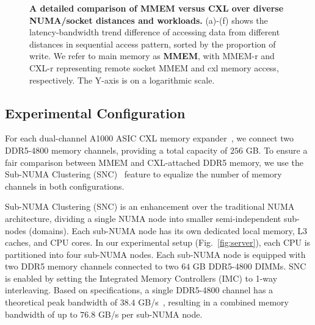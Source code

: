 \begin{figure}[t]
{  \label{fig:writeonly}}%
 \caption[A detailed comparison of MMEM versus CXL over diverse NUMA/socket distances and workloads]{\textbf{A detailed comparison of MMEM versus CXL over diverse NUMA/socket distances and workloads.} (a)-(f) shows the latency-bandwidth trend difference of accessing data from different distances in sequential access pattern, sorted by the proportion of write. We refer to main memory as \textbf{MMEM}, with MMEM-r and CXL-r representing remote socket MMEM and cxl memory access, respectively. The Y-axis is on a logarithmic scale.}
\label{fig:microbench-2}
\end{figure}

\subsection{Experimental Configuration}
\label{ssec:config}
For each dual-channel A1000 ASIC CXL memory expander~\cite{A1000}, we connect two DDR5-4800 memory channels, providing a total capacity of $256$ GB. To ensure a fair comparison between MMEM and CXL-attached DDR5 memory, we use the Sub-NUMA Clustering (SNC)~\cite{snc} feature to equalize the number of memory channels in both configurations. 

 Sub-NUMA Clustering (SNC) is an enhancement over the traditional NUMA architecture, dividing a single NUMA node into smaller semi-independent sub-nodes (domains). Each sub-NUMA node has its own dedicated local memory, L3 caches, and CPU cores. In our experimental setup (Fig.~\ref{fig:server}), each CPU is partitioned into four sub-NUMA nodes. Each sub-NUMA node is equipped with two DDR5 memory channels connected to two $64$ GB DDR5-4800 DIMMs. SNC is enabled by setting the Integrated Memory Controllers (IMC) to 1-way interleaving. Based on specifications, a single DDR5-4800 channel has a theoretical peak bandwidth of $38.4$ GB/s~\cite{cxlcentric}, resulting in a combined memory bandwidth of up to $76.8$ GB/s per sub-NUMA node.


